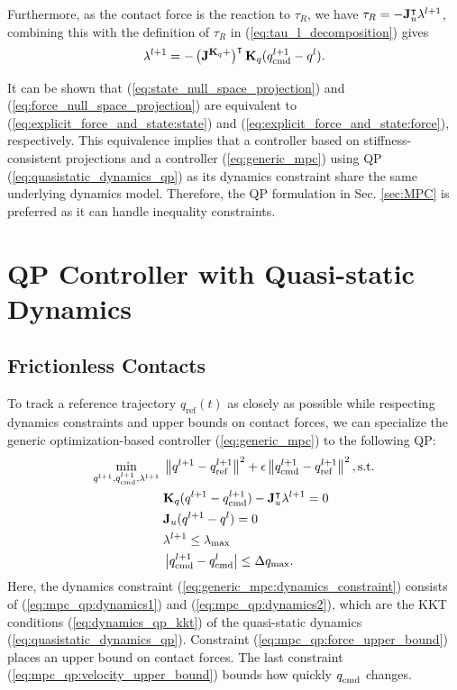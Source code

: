 Furthermore, as the contact force is the reaction to $\tau_R$, we have $\tau_R = -\J_u^\intercal \lambda^{l+1}$, combining this with the definition of $\tau_R$ in (\ref{eq:tau_l_decomposition}) gives
\begin{equation}
\label{eq:force_null_space_projection}
\lambda^{l+1} = -\left(\J^{\mb{K}_q+} \right)^\intercal \mb{K}_q(\qcmd[l+1] - q^l).
\end{equation}

It can be shown that (\ref{eq:state_null_space_projection}) and (\ref{eq:force_null_space_projection}) are equivalent to (\ref{eq:explicit_force_and_state:state}) and (\ref{eq:explicit_force_and_state:force}), respectively. This equivalence implies that a controller based on stiffness-consistent projections and a controller (\ref{eq:generic_mpc}) using QP (\ref{eq:quasistatic_dynamics_qp}) as its dynamics constraint share the same underlying dynamics model. Therefore, the QP formulation in Sec. \ref{sec:MPC} is preferred as it can handle inequality constraints.


\section{QP Controller with Quasi-static Dynamics \label{sec:MPC}}
\subsection{Frictionless Contacts}
To track a reference trajectory $q_\text{ref}(t)$ as closely as possible while respecting dynamics constraints and upper bounds on contact forces, we can specialize the generic optimization-based controller (\ref{eq:generic_mpc}) to the following QP:
\begin{subequations}
\label{eq:mpc_qp1}
\begin{align}
\underset{q^{l+1}, q_{\text{cmd}}^{l+1}, \lambda^{l+1}} {\rm min} \; &\left\|q^{l+1} - q_\text{ref}^{l+1}\right\|^2 + 
\epsilon \left\|q_{\rm cmd}^{l+1} - q_\text{ref}^{l+1}\right\|^2 , \text{s.t.} \label{eq:mpc_qp1:objective} \\
&\mb{K}_q(q^{l+1} - q_\text{cmd}^{l+1}) - \J_u^\intercal \lambda^{l+1} = 0 \label{eq:mpc_qp:dynamics1}\\
&\J_u(q^{l+1} - q^l) = 0 \label{eq:mpc_qp:dynamics2}\\
&\lambda^{l+1} \leq \lambda_\text{max} \label{eq:mpc_qp:force_upper_bound}\\
&\left|q_\text{cmd}^{l+1} - \qcmd[l]\right| \leq \Delta q_\text{max}. \label{eq:mpc_qp:velocity_upper_bound}
\end{align}
\end{subequations}
Here, the dynamics constraint (\ref{eq:generic_mpc:dynamics_constraint}) consists of (\ref{eq:mpc_qp:dynamics1}) and (\ref{eq:mpc_qp:dynamics2}), which are the KKT conditions (\ref{eq:dynamics_qp_kkt}) of the quasi-static dynamics (\ref{eq:quasistatic_dynamics_qp}). Constraint (\ref{eq:mpc_qp:force_upper_bound}) places an upper bound on contact forces. The last constraint (\ref{eq:mpc_qp:velocity_upper_bound}) bounds how quickly $\qcmd$ changes.

